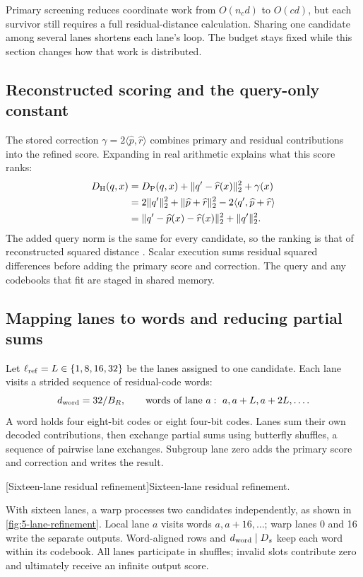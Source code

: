 Primary screening reduces coordinate work from $O(n_cd)$ to $O(cd)$,
but each survivor still requires a full residual-distance calculation.
Sharing one candidate among several lanes shortens each lane's loop.
The budget stays fixed while this section changes how that work is
distributed.

\subsection{Reconstructed scoring and the query-only constant}

The stored correction $\gamma=2\langle\widehat p,\widehat r\rangle$
combines primary and residual contributions into the refined score.
Expanding in real arithmetic explains what this score ranks:
\begin{align}
 D_{\mathrm{H}}(q,x)
 &=D_{\mathrm{P}}(q,x)+\|q'-\widehat r(x)\|_2^2+\gamma(x)
 \label{eq:5-refined-score}\\
 &=2\|q'\|_2^2+\|\widehat p+\widehat r\|_2^2-2\langle q',\widehat p+\widehat r\rangle\nonumber\\
 &=\|q'-\widehat p(x)-\widehat r(x)\|_2^2+\|q'\|_2^2.
 \label{eq:5-refined-constant}
\end{align}
The added query norm is the same for every candidate, so the ranking is
that of reconstructed squared distance \cite{jhq}. Scalar execution
sums residual squared differences before adding the primary score and
correction. The query and any codebooks that fit are staged in shared
memory.

\subsection{Mapping lanes to words and reducing partial sums}

Let $\ell_{\mathrm{ref}}=L\in\{1,8,16,32\}$ be the lanes assigned to one candidate.
Each lane visits a strided sequence of residual-code words:
\[
 d_{\rm word}=32/B_R,\qquad
 \text{words of lane }a:\ a,a+L,a+2L,\ldots.
\]
A word holds four eight-bit codes or eight four-bit codes. Lanes sum
their own decoded contributions, then exchange partial sums using
butterfly shuffles, a sequence of pairwise lane exchanges. Subgroup lane
zero adds the primary score and correction and writes the result.

\par\medskip\noindent\begin{minipage}{\linewidth}
\captionsetup{hypcap=false}
\centering

[Sixteen-lane residual refinement]{Sixteen-lane residual refinement.}
\label{fig:5-lane-refinement}
\end{minipage}\par\medskip
With sixteen lanes, a warp processes two candidates independently, as
shown in \cref{fig:5-lane-refinement}. Local lane $a$ visits words
$a,a+16,\ldots$; warp lanes 0 and 16 write the separate outputs.
Word-aligned rows and $d_{\rm word}\mid D_s$ keep each word within its
codebook. All lanes participate in shuffles; invalid slots contribute
zero and ultimately receive an infinite output score.

